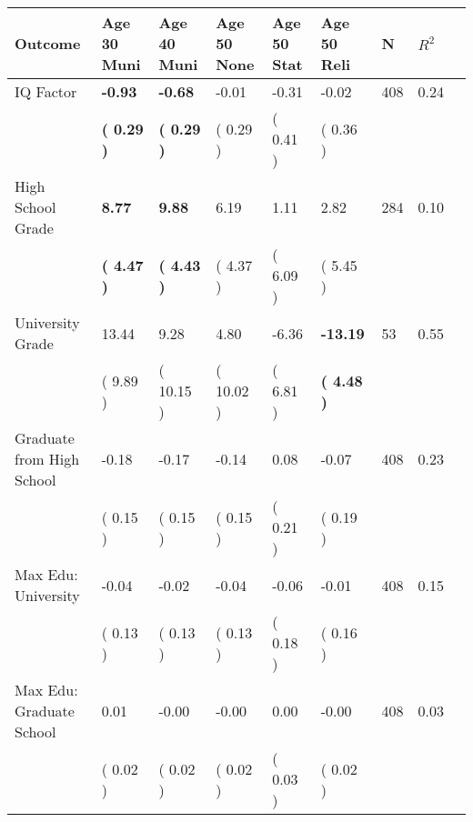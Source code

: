 \begin{tabular}{L{6.2cm} C{1.8cm} C{1.8cm} C{1.8cm} C{1.8cm} C{1.8cm} C{1.8cm} C{0.3cm} C{0.3cm}}
\toprule
 \textbf{Outcome} & \textbf{Age 30 Muni} & \textbf{Age 40 Muni} & \textbf{Age 50 None} & \textbf{Age 50 Stat} & \textbf{Age 50 Reli} & \textbf{N} & \textbf{$ R^2$} \\
\midrule
IQ Factor & \textbf{    -0.93} & \textbf{    -0.68} &     -0.01 &     -0.31 &     -0.02  & 408 &       0.24 \\ 
 & \textbf{(     0.29 )} & \textbf{(     0.29 )} & (     0.29 ) & (     0.41 ) & (     0.36 )  & \\
High School Grade & \textbf{     8.77} & \textbf{     9.88} &      6.19 &      1.11 &      2.82  & 284 &       0.10 \\ 
 & \textbf{(     4.47 )} & \textbf{(     4.43 )} & (     4.37 ) & (     6.09 ) & (     5.45 )  & \\
University Grade &     13.44 &      9.28 &      4.80 &     -6.36 & \textbf{   -13.19}  & 53 &       0.55 \\ 
 & (     9.89 ) & (    10.15 ) & (    10.02 ) & (     6.81 ) & \textbf{(     4.48 )}  & \\
Graduate from High School &     -0.18 &     -0.17 &     -0.14 &      0.08 &     -0.07  & 408 &       0.23 \\ 
 & (     0.15 ) & (     0.15 ) & (     0.15 ) & (     0.21 ) & (     0.19 )  & \\
Max Edu: University &     -0.04 &     -0.02 &     -0.04 &     -0.06 &     -0.01  & 408 &       0.15 \\ 
 & (     0.13 ) & (     0.13 ) & (     0.13 ) & (     0.18 ) & (     0.16 )  & \\
Max Edu: Graduate School &      0.01 &     -0.00 &     -0.00 &      0.00 &     -0.00  & 408 &       0.03 \\ 
 & (     0.02 ) & (     0.02 ) & (     0.02 ) & (     0.03 ) & (     0.02 )  & \\
\bottomrule
\end{tabular}
